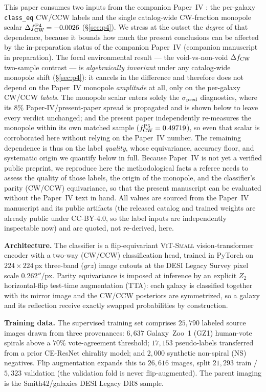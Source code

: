 \documentclass[aps,prd,twocolumn,superscriptaddress,showpacs,preprintnumbers,nofootinbib,longbibliography,floatfix]{revtex4-2}
\newcommand{\paperIVarxiv}{companion manuscript in preparation}
\begin{document}
This paper consumes two inputs from the companion Paper~IV
\cite{golden_chirality_2026}: the per-galaxy \texttt{class\_eq} CW/CCW
labels and the single catalog-wide CW-fraction monopole scalar
$\Delta f_{\rm CW}^{\rm P4}=-0.0026$ (\S\ref{sec:p4}). We stress at the
outset the \emph{degree} of that dependence, because it bounds how much
the present conclusions can be affected by the in-preparation status of
the companion Paper~IV (\paperIVarxiv). The focal environmental result --- the void-vs-non-void
$\Delta f_{\rm CW}$ two-sample contrast --- is \emph{algebraically
invariant} under any catalog-wide monopole shift (\S\ref{sec:p4}): it
cancels in the difference and therefore does not depend on the Paper~IV
monopole \emph{amplitude} at all, only on the per-galaxy CW/CCW
\emph{labels}. The monopole scalar enters solely the $\sigma_{\rm pred}$
diagnostics, where its $8\%$ Paper-IV/present-paper spread is propagated
and is shown below to leave every verdict unchanged; and the present
paper independently re-measures the monopole within its own matched
sample ($f_{\rm CW}^{\rm P5}=0.49719$), so even that scalar is
corroborated here without relying on the Paper~IV number. The remaining
dependence is thus on the label \emph{quality}, whose equivariance,
accuracy floor, and systematic origin we quantify below in full.
Because Paper~IV is not yet a verified public preprint, we reproduce here the
methodological facts a referee needs to assess the quality of those
labels, the origin of the monopole, and the classifier's parity
(CW/CCW) equivariance, so that the present manuscript can be evaluated
without the Paper~IV text in hand. All values are sourced from the
Paper~IV manuscript and its public artifacts (the released catalog and
trained weights are already public under CC-BY-4.0, so the label inputs
are independently inspectable now) and are quoted, not
re-derived, here.

\textbf{Architecture.} The classifier is a flip-equivariant
\textsc{ViT-Small} vision-transformer encoder with a two-way
(CW/CCW) classification head, trained in PyTorch on
$224\times224$\,px three-band ($grz$) image cutouts at the
DESI Legacy Survey pixel scale $0.262''$/px. Parity equivariance is
imposed at inference by an explicit $Z_2$ horizontal-flip
test-time augmentation (TTA): each galaxy is classified together with
its mirror image and the CW/CCW posteriors are symmetrized, so a galaxy
and its reflection receive exactly swapped probabilities by
construction.

\textbf{Training data.} The supervised training set comprises
$25{,}790$ labeled source images drawn from three provenances:
$6{,}637$ Galaxy~Zoo~1 (GZ1) human-vote spirals above a $70\%$
vote-agreement threshold; $17{,}153$ pseudo-labels transferred from a
prior CE-ResNet chirality model; and $2{,}000$ synthetic
non-spiral (NS) negatives. Flip augmentation expands this to
$26{,}616$ images, split $21{,}293$ train / $5{,}323$ validation
(the validation fold is never flip-augmented). The parent imaging is
the Smith42/galaxies DESI Legacy DR8 sample.
\end{document}
